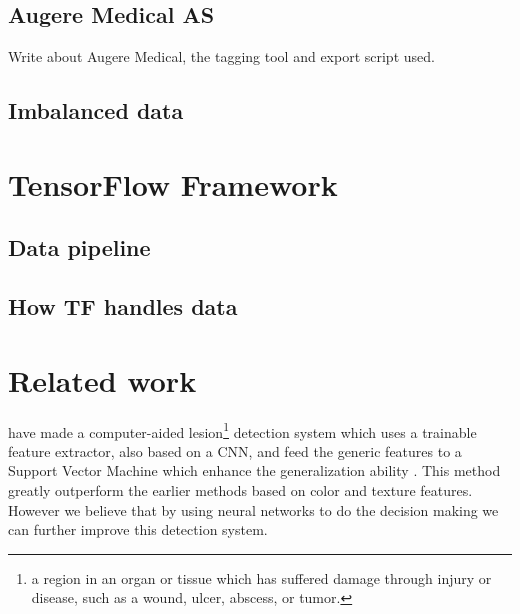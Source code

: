 \documentclass[thesis.tex]{subfiles}
\begin{document}
\subsection{Augere Medical AS} \label{sec:augere_medical}
Write about Augere Medical, the tagging tool and export script used.


\subsection{Imbalanced data}




\section{TensorFlow Framework} 


\subsection{Data pipeline} %


\subsection{How TF handles data}




\section{Related work} \label{relatedwork}
%
\citeauthor*{LesionDetection15} have made a computer-aided lesion\footnote{a region in an organ or tissue which has suffered damage through injury or disease, such as a wound, ulcer, abscess, or tumor.} detection system which uses a trainable feature extractor, also based on a CNN, and feed the generic features to a Support Vector Machine which enhance the generalization ability \cite{LesionDetection15}. This method greatly outperform the earlier methods based on color and texture features. However we believe that by using neural networks to do the decision making we can further improve this detection system. 
\end{document}
